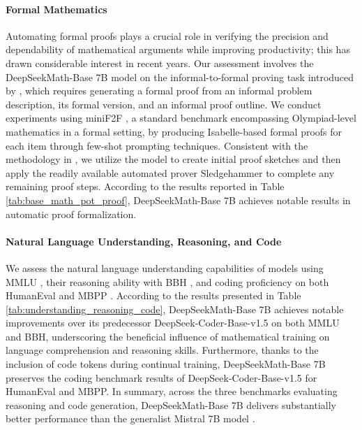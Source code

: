 \begin{itemize}[topsep=0pt]
\paragraph{Formal Mathematics}

Automating formal proofs plays a crucial role in verifying the precision and dependability of mathematical arguments while improving productivity; this has drawn considerable interest in recent years. Our assessment involves the DeepSeekMath-Base 7B model on the informal-to-formal proving task introduced by \citep{dsp_proof}, which requires generating a formal proof from an informal problem description, its formal version, and an informal proof outline. We conduct experiments using miniF2F \citep{minif2f}, a standard benchmark encompassing Olympiad-level mathematics in a formal setting, by producing Isabelle-based formal proofs for each item through few-shot prompting techniques. Consistent with the methodology in \cite{dsp_proof}, we utilize the model to create initial proof sketches and then apply the readily available automated prover Sledgehammer \citep{sledgehammer} to complete any remaining proof steps. According to the results reported in Table \ref{tab:base_math_pot_proof}, DeepSeekMath-Base 7B achieves notable results in automatic proof formalization.

\paragraph{Natural Language Understanding, Reasoning, and Code}

We assess the natural language understanding capabilities of models using MMLU \citep{mmlu}, their reasoning ability with BBH \citep{bbh}, and coding proficiency on both HumanEval \citep{codex} and MBPP \citep{mbpp}. According to the results presented in Table \ref{tab:understanding_reasoning_code}, DeepSeekMath-Base 7B achieves notable improvements over its predecessor DeepSeek-Coder-Base-v1.5 \citep{deepseek-coder} on both MMLU and BBH, underscoring the beneficial influence of mathematical training on language comprehension and reasoning skills. Furthermore, thanks to the inclusion of code tokens during continual training, DeepSeekMath-Base 7B preserves the coding benchmark results of DeepSeek-Coder-Base-v1.5 for HumanEval and MBPP. In summary, across the three benchmarks evaluating reasoning and code generation, DeepSeekMath-Base 7B delivers substantially better performance than the generalist Mistral 7B model \citep{mistral}.


\end{itemize}
